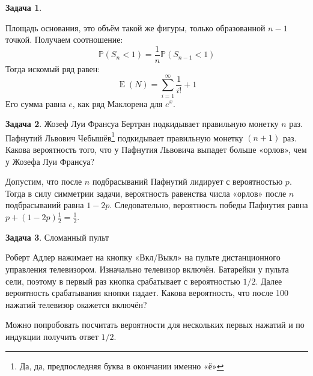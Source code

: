 \documentclass[nobib]{tufte-handout}
\theoremstyle{definition}
\newtheorem{problem}{Задача}
\DeclareMathOperator{\E}{E}
\renewcommand{\P}{\mathbb{P}}
\begin{document}
\begin{problem}
\begin{sol}
Площадь основания, это объём такой же фигуры, только образованной $n-1$ точкой. Получаем соотношение:
\[
\P (S_n < 1) = \frac{1}{n} \P (S_{n-1} < 1)
\]
Тогда искомый ряд равен:
\[
\E(N) = \sum_{i= 1}^{\infty} \frac{1}{i!} + 1
\]
Его сумма равна $e$, как ряд Маклорена для $e^x$.

\end{sol}


\end{problem}


\begin{problem}
Жозеф Луи Франсуа Бертран подкидывает правильную монетку $n$ раз. Пафнутий Львович Чебышёв\footnote{Да, да, предпоследняя буква в окончании именно «ё»} подкидывает правильную монетку $(n+1)$ раз. Какова вероятность того, что у Пафнутия Львовича выпадет больше «орлов», чем у Жозефа Луи Франсуа?

\begin{sol}
Допустим, что после $n$ подбрасываний Пафнутий лидирует с вероятностью $p$. Тогда в силу симметрии задачи, вероятность равенства числа «орлов» после $n$ подбрасываний равна $1-2p$. Следовательно, вероятность победы Пафнутия равна $p+(1-2p)\frac{1}{2}=\frac{1}{2}$.
\end{sol}

\end{problem}


\begin{problem}
Сломанный пульт

Роберт Адлер нажимает на кнопку «Вкл/Выкл» на пульте дистанционного управления телевизором. Изначально телевизор включён. Батарейки у пульта сели, поэтому в первый раз кнопка срабатывает с вероятностью $1/2$. Далее вероятность срабатывания кнопки падает. Какова вероятность, что после 100 нажатий телевизор окажется включён?


\begin{sol}
Можно попробовать посчитать вероятности для нескольких первых нажатий и по индукции получить ответ $1/2$.
\end{sol}

\end{problem}
\end{document}
